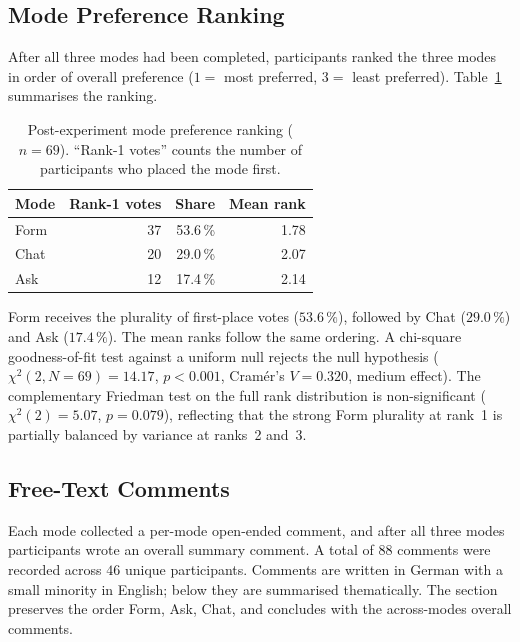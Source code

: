 \subsection{Mode Preference Ranking}

After all three modes had been completed, participants ranked the three modes
in order of overall preference ($1 =$ most preferred, $3 =$ least preferred).
Table~\ref{tab:mode-preference} summarises the ranking.

\begin{table}[htbp]
\centering
\caption{Post-experiment mode preference ranking ($n = 69$). ``Rank-1 votes''
counts the number of participants who placed the mode first.}
\label{tab:mode-preference}
\begin{tabular}{@{}l r r r@{}}
\toprule
Mode & Rank-1 votes & Share & Mean rank \\
\midrule
Form & 37 & 53.6\,\% & 1.78 \\
Chat & 20 & 29.0\,\% & 2.07 \\
Ask  & 12 & 17.4\,\% & 2.14 \\
\bottomrule
\end{tabular}
\end{table}

Form receives the plurality of first-place votes ($53.6\,\%$), followed by
Chat ($29.0\,\%$) and Ask ($17.4\,\%$). The mean ranks follow the same
ordering. A chi-square goodness-of-fit test against a uniform null rejects
the null hypothesis ($\chi^2(2, N = 69) = 14.17$, $p < 0.001$, Cramér's
$V = 0.320$, medium effect). The complementary Friedman test on the full
rank distribution is non-significant ($\chi^2(2) = 5.07$, $p = 0.079$),
reflecting that the strong Form plurality at rank~1 is partially balanced by
variance at ranks~2 and~3.

\subsection{Free-Text Comments}

Each mode collected a per-mode open-ended comment, and after all three modes
participants wrote an overall summary comment. A total of $88$ comments were
recorded across $46$ unique participants. Comments are written in German with
a small minority in English; below they are summarised thematically. The
section preserves the order Form, Ask, Chat, and concludes with the
across-modes overall comments.

